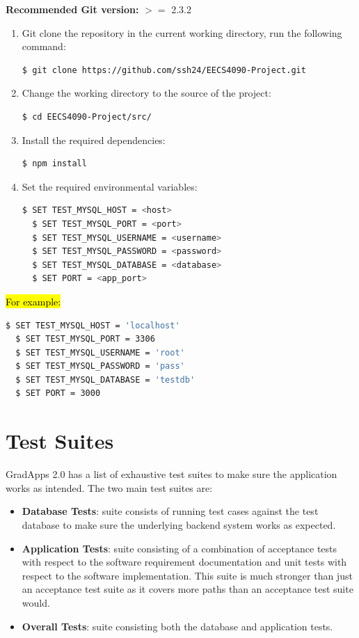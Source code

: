 \documentclass[fontsize=12pt,paper=letter,twoside]{scrartcl}
\begin{document}
\bigskip
\noindent \textbf{Recommended Git version:} $>=$ 2.3.2

\smallskip
\begin{enumerate}
\item Git clone the repository in the current working directory, run the following command:
\begin{lstlisting}[language=bash]
  $ git clone https://github.com/ssh24/EECS4090-Project.git
\end{lstlisting}
\item Change the working directory to the source of the project:
\begin{lstlisting}[language=bash]
  $ cd EECS4090-Project/src/
\end{lstlisting}
\item Install the required dependencies:
\begin{lstlisting}[language=bash]
  $ npm install
\end{lstlisting}
\item Set the required environmental variables:
\begin{lstlisting}[language=bash]
  $ SET TEST_MYSQL_HOST = <host>
  $ SET TEST_MYSQL_PORT = <port>
  $ SET TEST_MYSQL_USERNAME = <username>
  $ SET TEST_MYSQL_PASSWORD = <password>
  $ SET TEST_MYSQL_DATABASE = <database>
  $ SET PORT = <app_port>
\end{lstlisting}
\end{enumerate}

\smallskip
\noindent \hl{For example:}
\begin{lstlisting}[language=bash]
  $ SET TEST_MYSQL_HOST = 'localhost'
  $ SET TEST_MYSQL_PORT = 3306
  $ SET TEST_MYSQL_USERNAME = 'root'
  $ SET TEST_MYSQL_PASSWORD = 'pass'
  $ SET TEST_MYSQL_DATABASE = 'testdb'
  $ SET PORT = 3000
\end{lstlisting}

\newpage
\section{Test Suites}
GradApps 2.0 has a list of exhaustive test suites to make sure the application works as intended. The two main test suites are:

\begin{itemize}
\item \textbf{Database Tests}: suite consists of running test cases against the test database to make sure the underlying backend system works as expected.
\item \textbf{Application Tests}: suite consisting of a combination of acceptance tests with respect to the software requirement documentation and unit tests with respect to the software implementation. This suite is much stronger than just an acceptance test suite as it covers more paths than an acceptance test suite would.
\item \textbf{Overall Tests}: suite consisting both the database and application tests.
\end{itemize}
\end{document}
